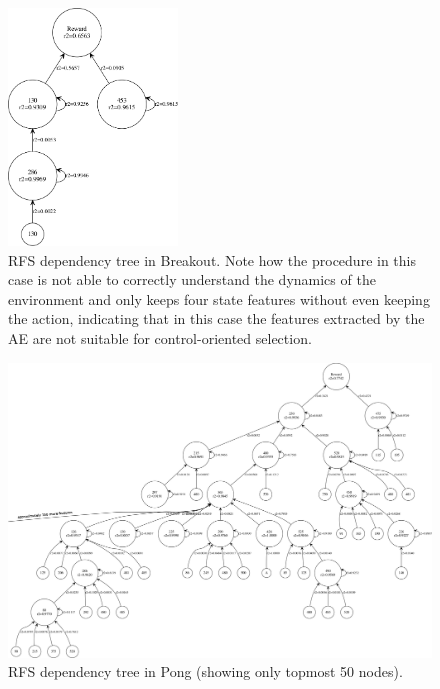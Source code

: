 %
%
\begin{figure}
    \includegraphics[width=0.4\textwidth]{pictures/experiments/rfs_tree_breakout}
    \centering
    \caption[RFS dependency tree in Breakout]{RFS dependency tree in Breakout.
	    Note how the procedure in this case is not able to correctly 
	    understand the dynamics of the environment and only keeps four 
	    state features without even keeping the action, indicating that in 
	    this case the features extracted by the AE are not suitable for 
	    control-oriented selection.}
    \label{f:rfs_tree_breakout}
\end{figure}
%
%
\begin{figure}
    \includegraphics[width=\textwidth]{pictures/experiments/rfs_tree_top_pong}
    \centering
    \caption[RFS dependency tree in Pong]{RFS dependency tree in Pong 
	     (showing only topmost 50 nodes).}
    \label{f:rfs_tree_pong}
\end{figure}
%
%
